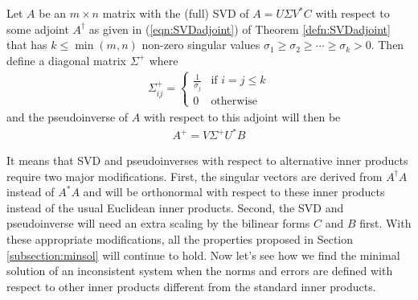 \begin{defn}
Let $A$ be an $m \times n$ matrix with the (full) SVD of $A = U\Sigma V^*C$ with respect to some adjoint $A^\dag$ as given in (\ref{eqn:SVDadjoint}) of Theorem \ref{defn:SVDadjoint} that has $k \leq \min(m,n)$ non-zero singular values $\sigma_1 \geq \sigma_2 \geq \cdots \geq \sigma_k > 0$. Then define a diagonal matrix $\Sigma^+$ where
\begin{align}
\Sigma^+_{ij} = \begin{cases}
\frac{1}{\sigma_j} & \text{if $i = j \leq k$} \\
0 & \text{otherwise}
\end{cases}
\end{align}
and the pseudoinverse of $A$ with respect to this adjoint will then be
\begin{align}
A^+ = V \Sigma^+ U^* B \label{eqn:pinvadjoint}
\end{align}
\end{defn}
It means that SVD and pseudoinverses with respect to alternative inner products require two major modifications. First, the singular vectors are derived from $A^\dag A$ instead of $A^* A$ and will be orthonormal with respect to these inner products instead of the usual Euclidean inner products. Second, the SVD and pseudoinverse will need an extra scaling by the bilinear forms $C$ and $B$ first. With these appropriate modifications, all the properties proposed in Section \ref{subsection:minsol} will continue to hold. Now let's see how we find the minimal solution of an inconsistent system when the norms and errors are defined with respect to other inner products different from the standard inner products.
